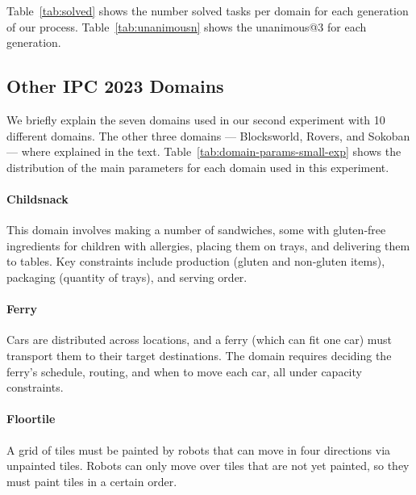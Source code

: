 \documentclass{article}
\begin{document}



Table~\ref{tab:solved} shows the number solved tasks per domain for each
generation of our process. Table~\ref{tab:unanimousn} shows the unanimous@3 for
each generation.




\subsection{Other IPC 2023 Domains}
\label{sec:domains}

We briefly explain the seven domains used in our second experiment with 10
different domains. The other three domains --- Blocksworld, Rovers, and Sokoban
--- where explained in the text. Table~\ref{tab:domain-params-small-exp} shows
the distribution of the main parameters for each domain used in this experiment.

\paragraph{Childsnack}

This domain involves making a number of sandwiches, some with gluten‐free
ingredients for children with allergies, placing them on trays, and delivering
them to tables. Key constraints include production (gluten and non‐gluten
items), packaging (quantity of trays), and serving order.

\paragraph{Ferry}

Cars are distributed across locations, and a ferry (which can fit one car) must
transport them to their target destinations. The domain requires deciding the
ferry’s schedule, routing, and when to move each car, all under capacity
constraints.

\paragraph{Floortile}

A grid of tiles must be painted by robots that can move in four directions via
unpainted tiles. Robots can only move over tiles that are not yet painted, so
they must paint tiles in a certain order.
\end{document}
